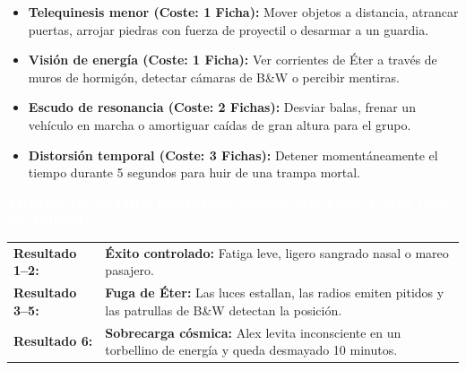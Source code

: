 \documentclass[10pt,a4paper,oneside]{book}
\newcommand{\strip}[1]{%
  \vspace{1.5mm}\noindent
  \colorbox{EterAlien}{\parbox{\dimexpr\linewidth-2\fboxsep\relax}{%
    \textcolor{white}{\industrialfont\bfseries\small\MakeUppercase{#1}}}}\par
  \vspace{1.5mm}}
\begin{document}
\vspace{1mm}
\begin{itemize}[leftmargin=1.5em]
  \item \textbf{Telequinesis menor (Coste: 1 Ficha):} Mover objetos a distancia, atrancar puertas, arrojar piedras con fuerza de proyectil o desarmar a un guardia.
  \item \textbf{Visión de energía (Coste: 1 Ficha):} Ver corrientes de Éter a través de muros de hormigón, detectar cámaras de B\&W o percibir mentiras.
  \item \textbf{Escudo de resonancia (Coste: 2 Fichas):} Desviar balas, frenar un vehículo en marcha o amortiguar caídas de gran altura para el grupo.
  \item \textbf{Distorsión temporal (Coste: 3 Fichas):} Detener momentáneamente el tiempo durante 5 segundos para huir de una trampa mortal.
\end{itemize}

\strip{Tirada de Estrés Psíquico (Lanza 1d6 tras cada uso de poder)}

\vspace{1mm}
\begin{tabularx}{\linewidth}{l X}
  \textbf{Resultado 1--2:} & \textbf{Éxito controlado:} Fatiga leve, ligero sangrado nasal o mareo pasajero.\\
  \textbf{Resultado 3--5:} & \textbf{Fuga de Éter:} Las luces estallan, las radios emiten pitidos y las patrullas de B\&W detectan la posición.\\
  \textbf{Resultado 6:}    & \textbf{Sobrecarga cósmica:} Alex levita inconsciente en un torbellino de energía y queda desmayado 10 minutos.\\
\end{tabularx}
\end{document}
